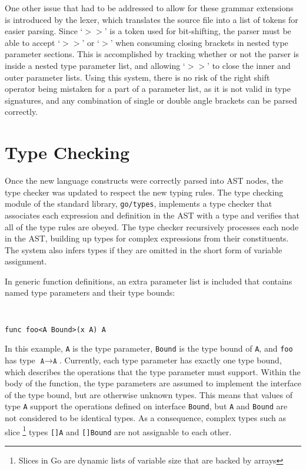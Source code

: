 \documentclass[letterpaper,twocolumn,11pt]{article}
\begin{document}
One other issue that had to be addressed to allow for these grammar extensions is introduced by the lexer, which translates the source file into a list of tokens for easier parsing. Since `\textbf{$>>$}' is a token used for bit-shifting, the parser must be able to accept `\textbf{$>>$}' or  `\textbf{$>$}' when consuming closing brackets in nested type parameter sections. This is accomplished by tracking whether or not the parser is inside a nested type parameter list, and allowing  `\textbf{$>>$}' to close the inner and outer parameter lists. Using this system, there is no risk of the right shift operator being mistaken for a part of a parameter list, as it is not valid in type signatures, and any combination of single or double angle brackets can be parsed correctly.

\section{Type Checking} \label{type_checking}

Once the new language constructs were correctly parsed into AST nodes, the type checker was updated to respect the new typing rules. The type checking module of the standard library, \texttt{go/types}, implements a type checker that associates each expression and definition in the AST with a type and verifies that all of the type rules are obeyed. The type checker recursively processes each node in the AST, building up types for complex expressions from their constituents. The system also infers types if they are omitted in the short form of variable assignment. 

In generic function definitions, an extra parameter list is included that contains named type parameters and their type bounds:

{ \tt \small
\begin{verbatim}
func foo<A Bound>(x A) A
\end{verbatim}
}

In this example, \texttt{A} is the type parameter, \texttt{Bound} is the type bound of \texttt{A}, and \texttt{foo} has type $\texttt{A} \rightarrow \texttt{A}$. Currently, each type parameter has exactly one type bound, which describes the operations that the type parameter must support. Within the body of the function, the type parameters are assumed to implement the interface of the type bound, but are otherwise unknown types. This means that values of type \texttt{A} support the operations defined on interface \texttt{Bound}, but \texttt{A} and \texttt{Bound} are not considered to be identical types. As a consequence, complex types such as slice \footnote{Slices in Go are dynamic lists of variable size that are backed by arrays} types \texttt{[]A} and \texttt{[]Bound} are not assignable to each other.
\end{document}
